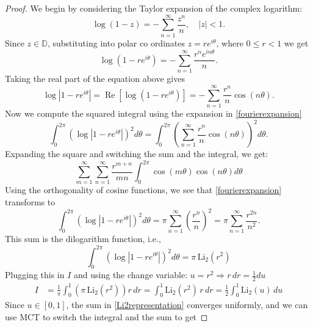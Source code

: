 \documentclass[9pt,a4paper,reqno]{amsart}
\newcommand{\D}{{\mathbb{D}}}
\theoremstyle{mine}
\theoremstyle{definition}
\theoremstyle{remark}
\begin{document}
\begin{proof}
    We begin by considering the Taylor expansion of the complex logarithm:
\begin{equation*}
\log(1 - z) = -\sum_{n=1}^\infty \frac{z^n}{n}, \quad |z| < 1.
\end{equation*}
Since $z\in \D$, substituting into polar co ordinates \( z = r e^{i\theta} \), where \( 0 \leq r < 1 \) we get
\begin{equation*}
\log(1 - r e^{i\theta}) = -\sum_{n=1}^\infty \frac{r^n e^{i n\theta}}{n}.
\end{equation*}
Taking the real part of the equation above gives
\begin{equation}\label{fourierexpansion}
\log|1 - r e^{i\theta}| = \operatorname{Re}\left[ \log(1 - r e^{i\theta}) \right] = -\sum_{n=1}^\infty \frac{r^n}{n} \cos(n\theta).
\end{equation}
Now we compute the squared integral using the expansion in \eqref{fourierexpansion}
\begin{equation}
\int_0^{2\pi} \left( \log|1 - r e^{i\theta}| \right)^2 d\theta = \int_0^{2\pi} \left( \sum_{n=1}^\infty \frac{r^n}{n} \cos(n\theta) \right)^2 d\theta.
\end{equation}
Expanding the square and switching the sum and the integral, we get:
\begin{equation*}
\sum_{m=1}^\infty \sum_{n=1}^\infty \frac{r^{m+n}}{mn} \int_0^{2\pi} \cos(m\theta) \cos(n\theta) d\theta
\end{equation*}
Using the orthogonality of cosine functions,
we see that \eqref{fourierexpansion} transforms to
\begin{equation}\label{Li2representation}
\int_0^{2\pi} \left( \log|1 - r e^{i\theta}| \right)^2 d\theta = \pi \sum_{n=1}^\infty \left( \frac{r^n}{n} \right)^2 = \pi \sum_{n=1}^\infty \frac{r^{2n}}{n^2}.
\end{equation}
This sum is the dilogarithm function, i.e.,
\begin{equation*}
\int_0^{2\pi} \left( \log|1 - r e^{i\theta}| \right)^2 d\theta = \pi \, \text{Li}_2(r^2)
\end{equation*}
Plugging this in $I$ and using the change variable: \( u = r^2 \Rightarrow r \, dr = \frac{1}{2} du \)
\begin{align*}
I &= \frac{1}{\pi} \int_0^1 \left( \pi \, \text{Li}_2(r^2) \right) r \, dr = \int_0^1 \text{Li}_2(r^2) \, r \, dr =\frac{1}{2} \int_0^1 \text{Li}_2(u) \, du
\end{align*}
Since $u \in [0,1]$, the sum in \eqref{Li2representation} converges uniformly, and we can use MCT to switch the integral and the sum to get

\end{proof}
\end{document}
